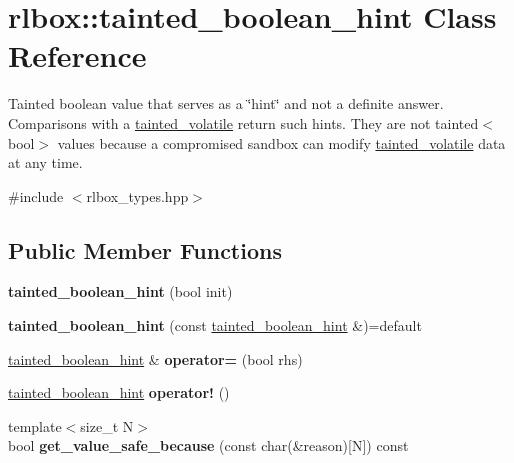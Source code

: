 \hypertarget{classrlbox_1_1tainted__boolean__hint}{}\section{rlbox\+:\+:tainted\+\_\+boolean\+\_\+hint Class Reference}
\label{classrlbox_1_1tainted__boolean__hint}


Tainted boolean value that serves as a \char`\"{}hint\char`\"{} and not a definite answer. Comparisons with a \hyperlink{classrlbox_1_1tainted__volatile}{tainted\+\_\+volatile} return such hints. They are not {\ttfamily tainted$<$bool$>$} values because a compromised sandbox can modify \hyperlink{classrlbox_1_1tainted__volatile}{tainted\+\_\+volatile} data at any time.  




{\ttfamily \#include $<$rlbox\+\_\+types.\+hpp$>$}

\subsection*{Public Member Functions}
\begin{DoxyCompactItemize}
\item 
\mbox{\label{classrlbox_1_1tainted__boolean__hint_a14cea878f2d1cbf8722491cc0abe875f}} 
{\bfseries tainted\+\_\+boolean\+\_\+hint} (bool init)
\item 
\mbox{\label{classrlbox_1_1tainted__boolean__hint_adea514e39039a1278dc00b59ec911ce2}} 
{\bfseries tainted\+\_\+boolean\+\_\+hint} (const \hyperlink{classrlbox_1_1tainted__boolean__hint}{tainted\+\_\+boolean\+\_\+hint} \&)=default
\item 
\mbox{\label{classrlbox_1_1tainted__boolean__hint_accd26753a15b8c1510418a1b0ef6ac81}} 
\hyperlink{classrlbox_1_1tainted__boolean__hint}{tainted\+\_\+boolean\+\_\+hint} \& {\bfseries operator=} (bool rhs)
\item 
\mbox{\label{classrlbox_1_1tainted__boolean__hint_ae47718163139bbc69009f5d853700690}} 
\hyperlink{classrlbox_1_1tainted__boolean__hint}{tainted\+\_\+boolean\+\_\+hint} {\bfseries operator!} ()
\item 
\mbox{\label{classrlbox_1_1tainted__boolean__hint_af75b9abf5d1b842a630b040bbcb38182}} 
{\footnotesize template$<$size\+\_\+t N$>$ }\\bool {\bfseries get\+\_\+value\+\_\+safe\+\_\+because} (const char(\&reason)\mbox{[}N\mbox{]}) const
\end{DoxyCompactItemize}


